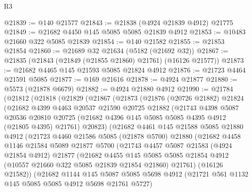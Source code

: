 \begin{lexlean}{R3}
\begin{coremodule}
@21839 := @140 @21577
@21843 := @21838 (@4924 @21839 @4912) @21775
@21849 := @21682 @4450 @145 @5085 @5085 @21839 @4912
@21853 := @10483 @21660 @322 @5085 @21839
@21854 := @140 @21582
@21855 := @21853 @21854
@21860 := @21689 @32 @21634 (@5182 (@21692 @32))
@21867 := @21835 (@21843 (@21849 (@21855 @21860) @21761) (@16126 @21577))
@21873 := @21682 @4465 @145 @21593 @5085 @21824 @4912
@21876 := @21723 @4464 @21591 @5085
@21877 := @169 @21616
@21878 := @4924 @21877
@21880 := @5573 (@21878 @6679)
@21882 := @4924 @21880 @4912
@21990 := @21784
    (@21812
      (@21818
        (@21829
          (@21867
            (@21873
              (@21876
                (@20726 @21882)
                @21824
                (@21682
                  @4399
                  @4463
                  @20537
                  @21590
                  @20725
                  @21882
                  (@21743
                    @4398
                    @5087
                    @20536
                    @20810
                    @20725
                    (@21682 @4396 @145 @5085 @5085 @4395 @4912 (@21805 @4395) @21761)
                    @20823)
                  (@21682
                    @4461
                    @145
                    @21588
                    @5085
                    @21880
                    @4912
                    (@21723
                      @4460
                      @21586
                      @5085
                      (@21878 @5700)
                      @21880
                      (@21682
                        @4458
                        @1146
                        @21584
                        @5089
                        @21877
                        @5700
                        (@21743
                          @4457
                          @5087
                          @21583
                          (@4924 @21854 @4912)
                          @21877
                          (@21682
                            @4455
                            @145
                            @5085
                            @5085
                            @21854
                            @4912
                            (@10557 @21660 @322 @5085 @21839 @21854 @21860)
                            @21761)
                          (@16126 @21582))
                        (@21682
                          @1144
                          @145
                          @5087
                          @5085
                          @5698
                          @4912
                          (@21721 @561 @1132 @145 @5085 @5085 @4912 @5698 @21761 @5727)

\end{coremodule}
\end{lexlean}
